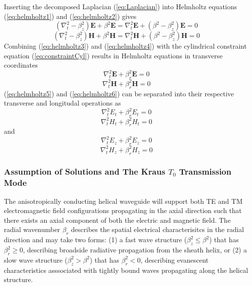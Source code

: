 Inserting the decomposed Laplacian (\ref{eq:Laplacian}) into Helmholtz equations (\ref{eq:helmholtz1}) and (\ref{eq:helmholtz2}) gives  
\begin{equation}\label{eq:helmholtz3}
	(\nabla_t^2 - \beta_z^2)\mathbf{E} + \beta^2 \mathbf{E} = \nabla_t^2\mathbf{E} + (\beta^2 - \beta_z^2)\mathbf{E} = 0
\end{equation}
\begin{equation}\label{eq:helmholtz4}
	(\nabla_t^2 - \beta_z^2)\mathbf{H} + \beta^2 \mathbf{H} = \nabla_t^2\mathbf{H} + (\beta^2 - \beta_z^2)\mathbf{H} = 0
\end{equation}
Combining (\ref{eq:helmholtz3}) and (\ref{eq:helmholtz4}) with the cylindrical constraint equation (\ref{eq:constraintCyl}) results in Helmholtz equations in transverse coordinates
\begin{equation}\label{eq:helmholtz5}
	\nabla_t^2 \mathbf{E} + \beta_r^2 \mathbf{E} = 0
\end{equation}
\begin{equation}\label{eq:helmholtz6}
	\nabla_t^2 \mathbf{H} + \beta_r^2 \mathbf{H} = 0
\end{equation}
(\ref{eq:helmholtz5}) and (\ref{eq:helmholtz6}) can be separated into their respective transverse and longitudal operations as
\begin{equation}\label{eq:helmholtz7}
	\nabla_t^2 E_t + \beta_r^2 E_t = 0
\end{equation}
\begin{equation}\label{eq:helmholtz8}
	\nabla_t^2 H_t + \beta_r^2 H_t = 0
\end{equation}
and 
\begin{equation}\label{eq:helmholtz9}
	\nabla_t^2 E_z + \beta_r^2 E_z = 0
\end{equation}
\begin{equation}\label{eq:helmholtz10}
	\nabla_t^2 H_z + \beta_r^2 H_z = 0
\end{equation}

\subsubsection{Assumption of Solutions and The Kraus $T_0$ Transmission Mode}\label{subsubsec:assumption1}
The anisotropically conducting helical waveguide will support both TE and TM electromagnetic field configurations propagating in the axial direction such that there exists an axial component of both the electric and magnetic field. The radial wavenumber $\beta_r$ describes the spatial electrical characterisitcs in the radial direction and may take two forms: (1) a fast wave structure ($\beta_z^2 \le \beta^2$) that has $\beta_r^2 \ge 0$, describing broadside radiative propagation from the sheath helix, or (2) a slow wave structure ($\beta_z^2 > \beta^2$) that has $\beta_r^2 < 0$, describing evanescent characteristics asssociated with tightly bound waves propagating along the helical structure. 

